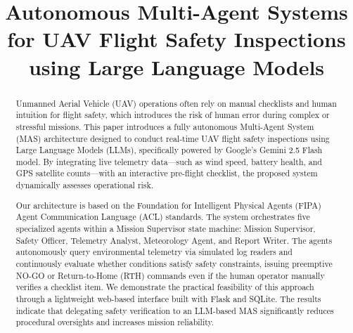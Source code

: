 \documentclass[conference]{IEEEtran}
\begin{document}
\title{Autonomous Multi-Agent Systems for UAV Flight Safety Inspections using Large Language Models}

\author{
\and
{}
\and
{}
}

\maketitle

\begin{abstract}
Unmanned Aerial Vehicle (UAV) operations often rely on manual checklists and human intuition for flight safety, which introduces the risk of human error during complex or stressful missions. This paper introduces a fully autonomous Multi-Agent System (MAS) architecture designed to conduct real-time UAV flight safety inspections using Large Language Models (LLMs), specifically powered by Google's Gemini 2.5 Flash model. By integrating live telemetry data—such as wind speed, battery health, and GPS satellite counts—with an interactive pre-flight checklist, the proposed system dynamically assesses operational risk.

Our architecture is based on the Foundation for Intelligent Physical Agents (FIPA) Agent Communication Language (ACL) standards. The system orchestrates five specialized agents within a Mission Supervisor state machine: Mission Supervisor, Safety Officer, Telemetry Analyst, Meteorology Agent, and Report Writer. The agents autonomously query environmental telemetry via simulated log readers and continuously evaluate whether conditions satisfy safety constraints, issuing preemptive NO-GO or Return-to-Home (RTH) commands even if the human operator manually verifies a checklist item. We demonstrate the practical feasibility of this approach through a lightweight web-based interface built with Flask and SQLite. The results indicate that delegating safety verification to an LLM-based MAS significantly reduces procedural oversights and increases mission reliability.
\end{abstract}
\end{document}
